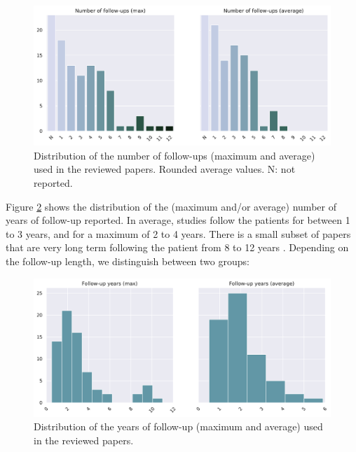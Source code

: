 \begin{figure}[!htbp]
\centering
\includegraphics[width=1.0\textwidth]{figures/review/Fig3.pdf}
    \caption[Distribution of the number of follow-ups used in the reviewed papers.]{Distribution of the number of follow-ups (maximum and average) used in the reviewed papers. Rounded average values. N: not reported.}\label{fig:followups}
\end{figure}

Figure \ref{fig:followups_years} shows the distribution of the (maximum and/or average) number of years of follow-up reported. In average, studies follow the patients for between 1 to 3 years, and for a maximum of 2 to 4 years. There is a small subset of papers that are very long term following the patient from 8 to 12 years \cite{Ghazi2019,Chen2012,Li2017b,Li2017c,Bilgel2015a,Bilgel2016}. Depending on the follow-up length, we distinguish between two groups:

\begin{figure}[!htbp]
\centering
\includegraphics[width=1.0\textwidth]{figures/review/Fig4.pdf}
    \caption[Distribution of the years of follow-up used in the reviewed papers.]{Distribution of the years of follow-up (maximum and average) used in the reviewed papers.}\label{fig:followups_years}
\end{figure}

